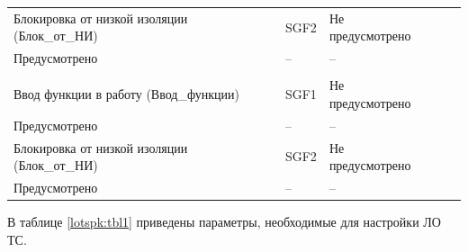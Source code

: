 \begin{longtable}{|>{\centering\arraybackslash}m{5.3cm}|>{\centering\arraybackslash}m{3.3cm}|>{\centering\arraybackslash}m{4.2cm}|>{\centering\arraybackslash}m{1.8cm}|>{\centering\arraybackslash}m{1cm}|}
\hline
\centering Блокировка от низкой изоляции (Блок\_от\_НИ)  & \centering SGF2 & \centering Не предусмотрено \\ Предусмотрено & \centering -- & \centering \arraybackslash -- \\
\hline
\multicolumn{5}{|c|}{ ЛО РД } \\ \hline 
\centering Ввод функции в работу (Ввод\_функции)  & \centering SGF1 & \centering Не предусмотрено \\ Предусмотрено & \centering -- & \centering \arraybackslash -- \\
\hline
\centering Блокировка от низкой изоляции (Блок\_от\_НИ)  & \centering SGF2 & \centering Не предусмотрено \\ Предусмотрено & \centering -- & \centering \arraybackslash -- \\
\hline
\end{longtable}
\normalsize


\par

В таблице \ref{lotspk:tbl1} приведены параметры, необходимые для настройки ЛО ТС.

